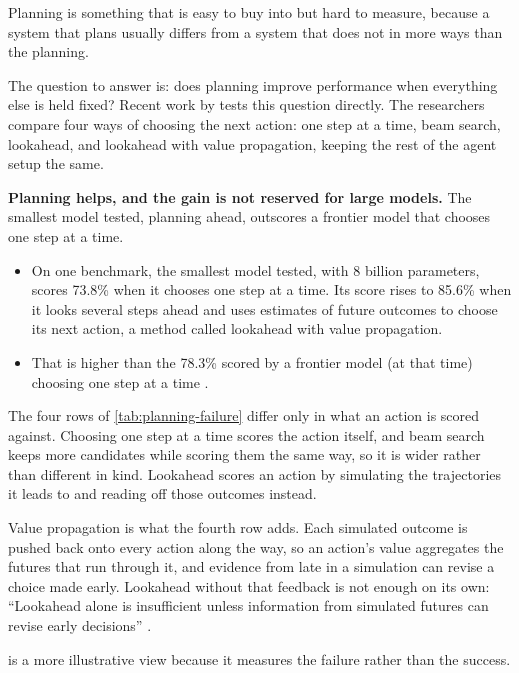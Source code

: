Planning is something that is easy to buy into but hard to measure, 
because a system that plans usually differs from a system that does 
not in more ways than the planning.

The question to answer is: does planning improve performance when everything else is held fixed? 
Recent work by \citet{wang2026reasoningplan} tests this question directly. The researchers compare
four ways of choosing the next action: one step at a time, beam search, lookahead, and lookahead
with value propagation, keeping the rest of the agent setup the same.

\textbf{Planning helps, and the gain is not reserved for large models.} The smallest model tested,
planning ahead, outscores a frontier model that chooses one step at a time.

\begin{itemize}
\item On one benchmark, the smallest model tested, with 8 billion parameters, scores 73.8\% when it chooses
one step at a time. Its score rises to 85.6\% when it looks several steps ahead and uses estimates
of future outcomes to choose its next action, a method called lookahead with value propagation.
\item That is higher than the 78.3\% scored by a frontier model (at that time) choosing one step at a time
\citep[Table~1]{wang2026reasoningplan}.
\end{itemize}

The four rows of \cref{tab:planning-failure} differ only in what an action is scored against.
Choosing one step at a time scores the action itself, and beam search keeps more candidates while
scoring them the same way, so it is wider rather than different in kind. Lookahead scores an action
by simulating the trajectories it leads to and reading off those outcomes instead.

Value propagation is what the fourth row adds. Each simulated outcome is pushed back onto every
action along the way, so an action's value aggregates the futures that run through it, and evidence
from late in a simulation can revise a choice made early. Lookahead without that feedback is not
enough on its own: ``Lookahead alone is insufficient unless information from simulated futures can
revise early decisions'' \citep[\S4.2]{wang2026reasoningplan}.

 is a more illustrative view because it measures the failure rather than
the success.

